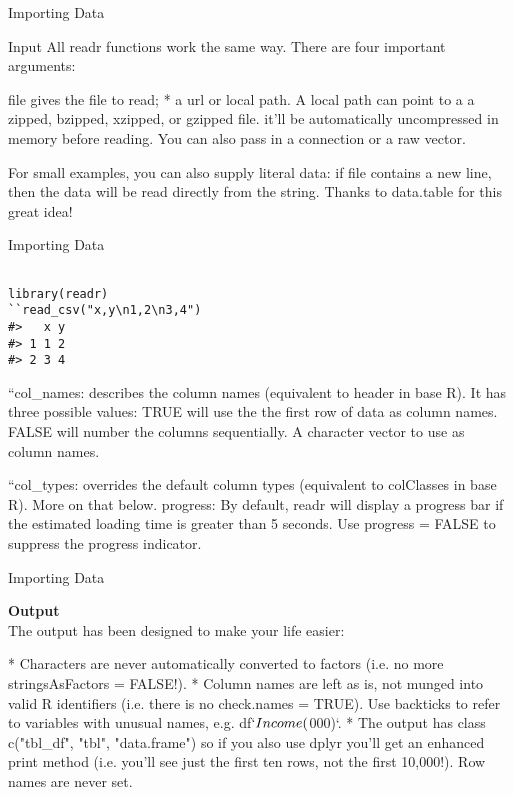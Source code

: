 
{Importing Data}


Input
All readr functions work the same way. There are four important arguments:


\item
file gives the file to read; 
* a url or local path. A local path can point to a a zipped, bzipped, xzipped, or gzipped file. it’ll be automatically 
uncompressed in memory before reading. You can also pass in a connection or a raw vector.

For small examples, you can also supply literal data: if file contains a new line, then the data will be read directly from the string. Thanks to data.table for this great idea!



{Importing Data}


\begin{framed}
\begin{verbatim}

library(readr)
``read_csv("x,y\n1,2\n3,4")
#>   x y
#> 1 1 2
#> 2 3 4
\end{verbatim}
\end{framed}

``col_names: describes the column names (equivalent to header in base R). It has three possible values:
TRUE will use the the first row of data as column names.
FALSE will number the columns sequentially.
A character vector to use as column names.

``col_types: overrides the default column types (equivalent to colClasses in base R). More on that below.
progress: By default, readr will display a progress bar if the estimated loading time is greater than 5 seconds. Use progress = FALSE to suppress the progress indicator.




{Importing Data}

\noindent \textbf{Output}\\
The output has been designed to make your life easier:


* Characters are never automatically converted to factors (i.e. no more stringsAsFactors = FALSE!).
* Column names are left as is, not munged into valid R identifiers (i.e. there is no check.names = TRUE). Use backticks to refer to variables with unusual names, e.g. df$`Income ($000)`.
* The output has class c("tbl_df", "tbl", "data.frame") so if you also use dplyr you’ll get an enhanced print method (i.e. you’ll see just the first ten rows, not the first 10,000!).
Row names are never set.



